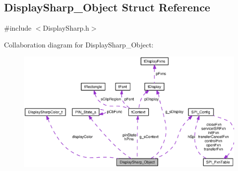 \subsection{Display\+Sharp\+\_\+\+Object Struct Reference}
\label{struct_display_sharp___object}


{\ttfamily \#include $<$Display\+Sharp.\+h$>$}



Collaboration diagram for Display\+Sharp\+\_\+\+Object\+:
\nopagebreak
\begin{figure}[H]
\begin{center}
\leavevmode
\includegraphics[width=350pt]{struct_display_sharp___object__coll__graph}
\end{center}
\end{figure}
